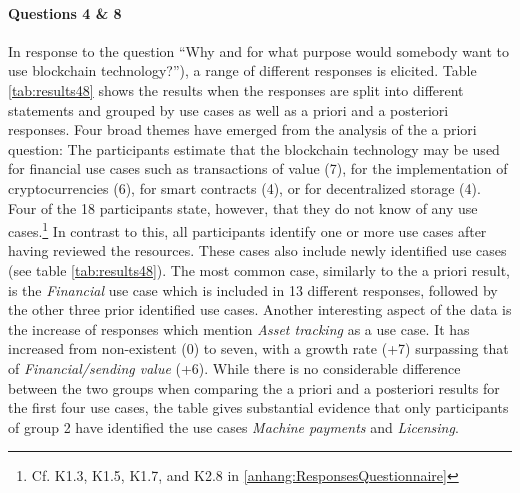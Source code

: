 \paragraph{Questions 4 \& 8} In response to the question \enquote{Why and for what purpose would somebody want to use blockchain technology?}), a range of different responses is elicited. Table \ref{tab:results48} shows the results when the responses are split into different statements and grouped by use cases as well as a priori and a posteriori responses.
Four broad themes have emerged from the analysis of the a priori question: The participants estimate that the blockchain technology may be used for financial use cases such as transactions of value (7), for the implementation of cryptocurrencies (6), for smart contracts (4), or for decentralized storage (4). Four of the 18 participants state, however, that they do not know of any use cases.\footnote{Cf. K1.3, K1.5, K1.7, and K2.8 in \ref{anhang:ResponsesQuestionnaire}} In contrast to this, all participants identify one or more use cases after having reviewed the resources. These cases also include newly identified use cases (see table \ref{tab:results48}). The most common case, similarly to the a priori result, is the \textit{Financial} use case which is included in 13 different responses, followed by the other three prior identified use cases.
Another interesting aspect of the data is the increase of responses which mention \textit{Asset tracking} as a use case. It has increased from non-existent (0) to seven, with a growth rate (+7) surpassing that of \textit{Financial/sending value} (+6). While there is no considerable difference between the two groups when comparing the a priori and a posteriori results for the first four use cases, the table gives substantial evidence that only participants of group 2 have identified the use cases \textit{Machine payments} and \textit{Licensing}.

